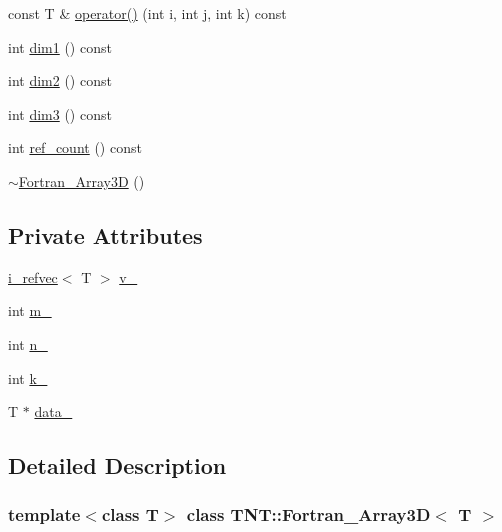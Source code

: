 \begin{DoxyCompactItemize}
const T \& \hyperlink{classTNT_1_1Fortran__Array3D_acd0ca0c6c51e43e14645abf3aba027c4}{operator()} (int i, int j, int k) const
\item 
int \hyperlink{classTNT_1_1Fortran__Array3D_a1dfd13ee1ae6a14718596441275b2e11}{dim1} () const
\item 
int \hyperlink{classTNT_1_1Fortran__Array3D_afbcc13764d51a8939626082d1d549786}{dim2} () const
\item 
int \hyperlink{classTNT_1_1Fortran__Array3D_a1c4989f3d7db053c3cb2f6f31fed3c09}{dim3} () const
\item 
int \hyperlink{classTNT_1_1Fortran__Array3D_a41a34fa9c1f35ac86273648bc8c9496f}{ref\+\_\+count} () const
\item 
\hyperlink{classTNT_1_1Fortran__Array3D_a9164c5369ef7b82b3c280dc9704527d9}{$\sim$\+Fortran\+\_\+\+Array3D} ()
\end{DoxyCompactItemize}
\subsection*{Private Attributes}
\begin{DoxyCompactItemize}
\item 
\hyperlink{classTNT_1_1i__refvec}{i\+\_\+refvec}$<$ T $>$ \hyperlink{classTNT_1_1Fortran__Array3D_a105630010987f0da8a68203277e799bf}{v\+\_\+}
\item 
int \hyperlink{classTNT_1_1Fortran__Array3D_a3f4db2fe79a5f3c4b05c20c5763428f5}{m\+\_\+}
\item 
int \hyperlink{classTNT_1_1Fortran__Array3D_ae717b2430033857fea81f7b5d7d4d070}{n\+\_\+}
\item 
int \hyperlink{classTNT_1_1Fortran__Array3D_a574ac1622f63254922786524b3dda1fb}{k\+\_\+}
\item 
T $\ast$ \hyperlink{classTNT_1_1Fortran__Array3D_a1f4ad51040b91887d61f043cd1bf8b90}{data\+\_\+}
\end{DoxyCompactItemize}


\subsection{Detailed Description}
\subsubsection*{template$<$class T$>$\newline
class T\+N\+T\+::\+Fortran\+\_\+\+Array3\+D$<$ T $>$}



